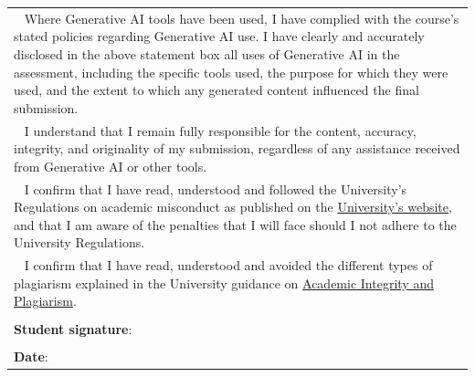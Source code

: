 \begin{longtable}{|>{\raggedright\arraybackslash}p{\textwidth}|}
		\textbullet~ Where Generative AI tools have been used, I have complied with the course’s stated policies regarding Generative AI use. I have clearly and accurately disclosed in the above statement box all uses of Generative AI in the assessment, including the specific tools used, the purpose for which they were used, and the extent to which any generated content influenced the final submission.
		\\
		
		\textbullet~ I understand that I remain fully responsible for the content, accuracy, integrity, and originality of my submission, regardless of any assistance received from Generative AI or other tools.
		\\

		\textbullet~ I confirm that I have read, understood and followed the University's Regulations on academic misconduct as published on the \href{https://www.hw.ac.uk/uk/services/academic-registry/academic-integrity/academic-misconduct.htm}{University's website}, and that I am aware of the penalties that I will face should I not adhere to the University Regulations.
		\\
		
		\textbullet~ I confirm that I have read, understood and avoided the different types of plagiarism explained in the University guidance on \href{https://heriotwatt.sharepoint.com/sites/skillshub/SitePages/Academic-Integrity-and-Plagiarism.aspx}{Academic Integrity and Plagiarism}.
		\\
		
		\\

		\noindent \textbf{Student signature}: \docAuthor
		\\
		
		\\
		
		\noindent \textbf{Date}: \docDate
		\\
	\hline
\end{longtable}




\clearpage